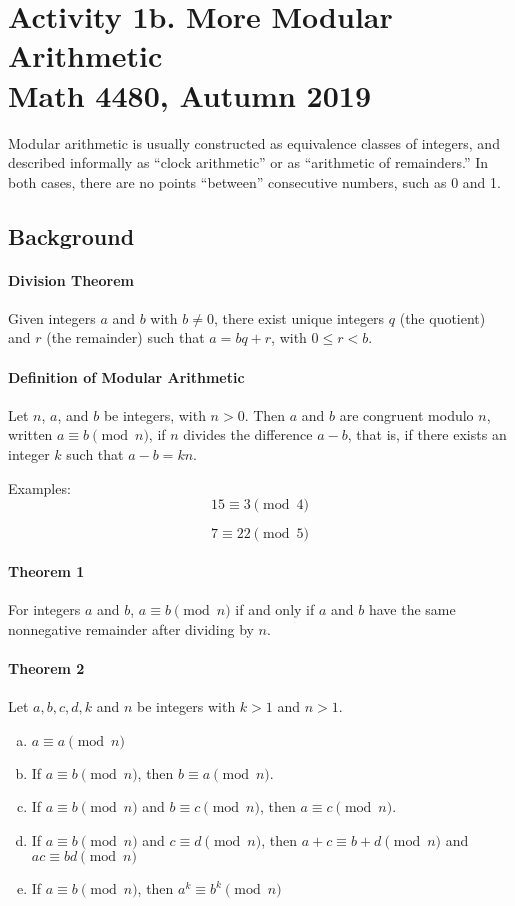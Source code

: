 \documentclass[10.5pt]{report}
\begin{document}



\section*{Activity 1b.  More Modular Arithmetic \\ \small{Math 4480, Autumn 2019}}

Modular arithmetic is usually constructed as equivalence classes of integers, and described informally as ``clock arithmetic'' or as ``arithmetic of remainders.''  In both cases, there are no points ``between'' consecutive numbers, such as 0 and 1.  

\subsection*{Background}
\paragraph{Division Theorem} Given integers $a$ and $b$ with $b\neq 0$, there exist unique integers $q$ (the quotient) and $r$ (the remainder) such that $a = bq + r$, with $0 \leq r < b$.
 
\paragraph{Definition of Modular Arithmetic}  Let $n$, $a$, and $b$ be integers, with $n > 0$.  Then $a$ and $b$ are congruent modulo $n$, written $a\equiv b\pmod{n}$, if $n$ divides the difference $a-b$, that is, if there exists an integer $k$ such that $a-b = kn$.
  
Examples:  
$$15\equiv 3 \pmod{4}$$

$$7\equiv  22 \pmod{5}$$

\paragraph{Theorem 1}
For integers $a$ and $b$, $a\equiv b \pmod{n}$ if and only if $a$ and $b$ have the same nonnegative remainder after dividing by $n$.

\paragraph{Theorem 2}
Let $a, b, c, d, k$ and $n$ be integers with $k>1$ and $n > 1$.
\begin{enumerate}[(a)]
\item $a\equiv a \pmod{n}$
\item If $a\equiv b \pmod{n}$, then $b\equiv a \pmod{n}$.  
\item If $a\equiv b \pmod{n}$ and $b\equiv c \pmod{n}$, then $a\equiv c \pmod{n}$.
\item If $a\equiv b \pmod{n}$ and $c\equiv d \pmod{n}$, then $a+c\equiv b+d \pmod{n}$ and $ac\equiv bd \pmod{n}$
\item If $a\equiv b \pmod{n}$, then $a^k\equiv b^k \pmod{n}$
\end{enumerate}
\end{document}
